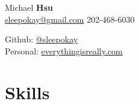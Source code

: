 \documentclass[]{deedy-resume-openfont}
\begin{document}
\begin{minipage}[t]{.6\textwidth}
\vspace{.0pt}
{\Huge Michael {\textbf{Hsu}}}
\vspace{4pt}\\
\href{mailto:sleepokay@gmail.com}{sleepokay@gmail.com} \textbullet{} 202-468-6030
\end{minipage}
\hfill
\begin{minipage}[t]{.3\textwidth}
\vspace{\topsep}
Github: \href{https://github.com/sleepokay}{@sleepokay}\\
Personal: \href{http://everythingisreally.com}{everythingisreally.com}
\end{minipage}
\namesection{}{} %

\vspace{\topsep} %


\vspace{\topsep} %

\section{Skills}
\begin{multicols}{2}
\descript{\quad}
\vspace{3pt}

\columnbreak

\descript{\quad}
\sectionsep
\end{multicols}





\end{document}
